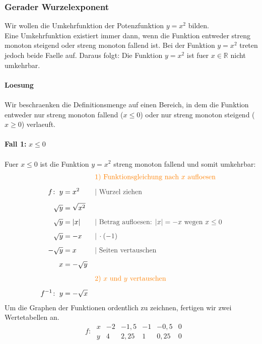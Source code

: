 \begin{multicols}{2}
    \subsubsection{Gerader Wurzelexponent}
    \vspace{-4mm}
    Wir wollen die Umkehrfunktion der Potenzfunktion $y = x^2$ bilden.\\
    Eine Umkehrfunktion existiert immer dann, wenn die Funktion entweder streng monoton steigend oder streng monoton fallend ist.
    Bei der Funktion $y = x^2$ treten jedoch beide Faelle auf. Daraus folgt: Die Funktion  $y = x^2$
    ist fuer $x \in \mathbb{R}$ nicht umkehrbar.\\~\\
    \textbf{Loesung}\\~\\
    Wir beschraenken die Definitionsmenge auf einen Bereich, in dem die Funktion entweder nur streng monoton fallend ($x \leq 0$) oder nur streng monoton steigend ($x \geq 0$) verlaeuft.\\~\\
    \textbf{Fall 1:} $x \leq 0$\\~\\
    Fuer $x \leq 0$ ist die Funktion $y = x^2$ streng monoton fallend und somit umkehrbar:
    \begin{align*} & &&{\color{orange}\text{1) Funktionsgleichung nach $x$ aufloesen}} \\[5px] f\colon\; y &= x^2 &&{\color{darkgray}| \text{ Wurzel ziehen}} \\[5px] \sqrt{y} &= \sqrt{x^2} \\[5px] \sqrt{y} &= |x| &&{\color{darkgray}| \text{ Betrag aufloesen: } |x| = -x \text{ wegen } x \leq 0} \\[5px] \sqrt{y} &= -x &&{\color{darkgray}|\, \cdot (-1)} \\[5px] -\sqrt{y} &= x &&{\color{darkgray}| \text{ Seiten vertauschen}} \\[5px] x &= -\sqrt{y} \\[5px] & &&{\color{orange}\text{2) $x$ und $y$ vertauschen}} \\[5px] f^{-1}\colon\; y &= -\sqrt{x} \end{align*}
    Um die Graphen der Funktionen ordentlich zu zeichnen, fertigen wir zwei Wertetabellen an.
    \[ \phantom{^{-1}}f\colon\; \begin{array}{r|c|c|c|c|c} x & -2 & -1{,}5 & -1 & -0{,}5 & 0 \\ \hline y & 4 & 2{,}25 & 1 & 0{,}25 & 0 \end{array}\]

\end{multicols}
